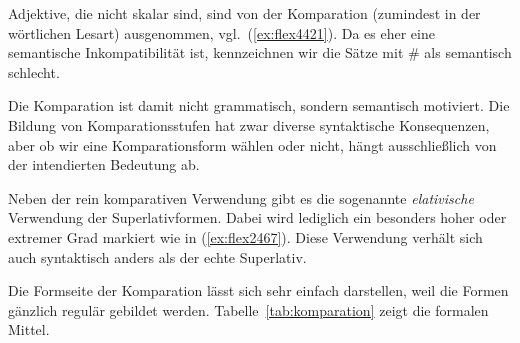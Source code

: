 \begin{exe}
  \ex \label{ex:flex4420}
  \begin{xlist}
  \end{xlist}
\end{exe}

Adjektive, die nicht skalar sind, sind von der Komparation (zumindest in der wörtlichen Lesart) ausgenommen, vgl.\ (\ref{ex:flex4421}).
Da es eher eine semantische Inkompatibilität ist, kennzeichnen wir die Sätze mit \# als semantisch schlecht.

\begin{exe}
  \ex \label{ex:flex4421}
  \begin{xlist}
  \end{xlist}
\end{exe}

Die Komparation ist damit nicht grammatisch, sondern semantisch motiviert.
Die Bildung von Komparationsstufen hat zwar diverse syntaktische Konsequenzen, aber ob wir eine Komparationsform wählen oder nicht, hängt ausschließlich von der intendierten Bedeutung ab.

Neben der rein komparativen Verwendung gibt es die sogenannte \textit{elativische} Verwendung der Superlativformen.
Dabei wird lediglich ein besonders hoher oder extremer Grad markiert wie in (\ref{ex:flex2467}).
Diese Verwendung verhält sich auch syntaktisch anders als der echte Superlativ.

\begin{exe}
\end{exe}


Die Formseite der Komparation lässt sich sehr einfach darstellen, weil die Formen gänzlich regulär gebildet werden.
Tabelle~\ref{tab:komparation} zeigt die formalen Mittel.

\begin{table}[!htbp]
  \centering
  \caption{Affixe der Komparation}
  \label{tab:komparation}
\end{table}

